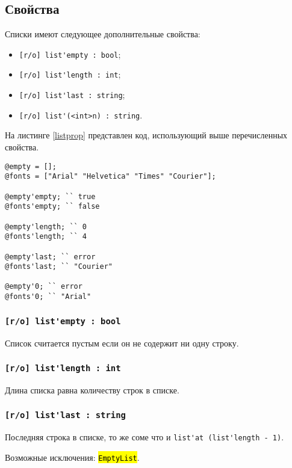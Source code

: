 \documentclass[a4paper, 14pt]{extarticle}
\newcommand{\ferror}[1]{{\fontsize{11pt}{12pt}\tt{\sethlcolor{yellow}\hl{#1}}}}
\newenvironment{icItems}
	{ \begin{itemize} [noitemsep,nolistsep] }
	{ \end{itemize} }
\begin{document}
\subsection{Свойства}

Списки имеют следующее дополнительные свойства:
\begin{icItems}
\item
	\lstinline|[r/o] list'empty : bool|;
\item
	\lstinline|[r/o] list'length : int|;
\item
	\lstinline|[r/o] list'last : string|;
\item
	\lstinline|[r/o] list'(<int>n) : string|.
\end{icItems}

На листинге \ref{listprop} представлен код, использующий выше перечисленных свойства.

\begin{lstlisting}[caption=Свойства класса list, label=listprop]
@empty = [];
@fonts = ["Arial" "Helvetica" "Times" "Courier"];

@empty'empty; `` true
@fonts'empty; `` false

@empty'length; `` 0
@fonts'length; `` 4

@empty'last; `` error
@fonts'last; `` "Courier"

@empty'0; `` error
@fonts'0; `` "Arial"
\end{lstlisting}

\subsubsection{\lstinline|[r/o] list'empty : bool|}

Список считается пустым если он не содержит ни одну строку.

\subsubsection{\lstinline|[r/o] list'length : int|}

Длина списка равна количеству строк в списке.

\subsubsection{\lstinline|[r/o] list'last : string|}

Последняя строка в списке, то же соме что и \lstinline|list'at (list'length - 1)|.

Возможные исключения: \ferror{EmptyList}.
\end{document}
